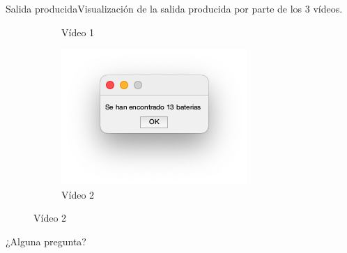 \documentclass{beamer}
\begin{document}
\begin{frame}{Salida producida}{Visualización de la salida producida por parte de los 3 vídeos.}
\begin{figure}
\begin{center}
\begin{subfigure}[b]{0.3\textwidth}
        \caption{Vídeo 1}
    \end{subfigure}
    \begin{subfigure}[b]{0.3\textwidth}
        \includegraphics[width=\textwidth]{img/S2.png}
        \caption{Vídeo 2}
    \end{subfigure}
\end{center}
    
\end{figure}
\end{frame}

\begin{frame}
    \begin{center}
        \Huge\calligra ¿Alguna pregunta?
    \end{center}
\end{frame}
\end{document}
